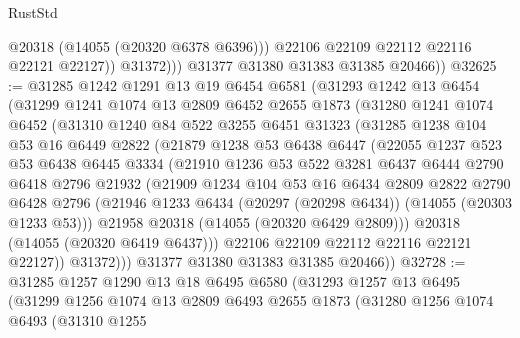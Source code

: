 \begin{lexlean}{RustStd}
\begin{coremodule}
                    @20318
                    (@14055 (@20320 @6378 @6396)))
                  @22106
                  @22109
                  @22112
                  @22116
                  @22121
                  @22127))
              @31372)))
        @31377
        @31380
        @31383
        @31385
        @20466))
@32625 := @31285
    @1242
    @1291
    @13
    @19
    @6454
    @6581
    (@31293
      @1242
      @13
      @6454
      (@31299
        @1241
        @1074
        @13
        @2809
        @6452
        @2655
        @1873
        (@31280
          @1241
          @1074
          @6452
          (@31310
            @1240
            @84
            @522
            @3255
            @6451
            @31323
            (@31285
              @1238
              @104
              @53
              @16
              @6449
              @2822
              (@21879
                @1238
                @53
                @6438
                @6447
                (@22055
                  @1237
                  @523
                  @53
                  @6438
                  @6445
                  @3334
                  (@21910
                    @1236
                    @53
                    @522
                    @3281
                    @6437
                    @6444
                    @2790
                    @6418
                    @2796
                    @21932
                    (@21909
                      @1234
                      @104
                      @53
                      @16
                      @6434
                      @2809
                      @2822
                      @2790
                      @6428
                      @2796
                      (@21946 @1233 @6434 (@20297 (@20298 @6434)) (@14055 (@20303 @1233 @53)))
                      @21958
                      @20318
                      (@14055 (@20320 @6429 @2809)))
                    @20318
                    (@14055 (@20320 @6419 @6437)))
                  @22106
                  @22109
                  @22112
                  @22116
                  @22121
                  @22127))
              @31372)))
        @31377
        @31380
        @31383
        @31385
        @20466))
@32728 := @31285
    @1257
    @1290
    @13
    @18
    @6495
    @6580
    (@31293
      @1257
      @13
      @6495
      (@31299
        @1256
        @1074
        @13
        @2809
        @6493
        @2655
        @1873
        (@31280
          @1256
          @1074
          @6493
          (@31310
            @1255

\end{coremodule}
\end{lexlean}

